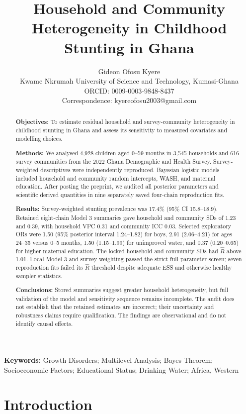 \documentclass[11pt]{article}
\title{Household and Community Heterogeneity in Childhood Stunting in Ghana}
\author{Gideon Ofosu Kyere\\\small Kwame Nkrumah University of Science and Technology, Kumasi-Ghana\\\small ORCID: 0009-0003-9848-8437\\\small Correspondence: kyereofosu2003@gmail.com}
\date{}
\begin{document}
\maketitle

\begin{abstract}
\noindent\textbf{Objectives:} To estimate residual household and survey-community heterogeneity in childhood stunting in Ghana and assess its sensitivity to measured covariates and modelling choices.

\noindent\textbf{Methods:} We analysed 4,928 children aged 0--59 months in 3,545 households and 616 survey communities from the 2022 Ghana Demographic and Health Survey. Survey-weighted descriptives were independently reproduced. Bayesian logistic models included household and community random intercepts, WASH, and maternal education. After posting the preprint, we audited all posterior parameters and scientific derived quantities in nine separately saved four-chain reproduction fits.

\noindent\textbf{Results:} Survey-weighted stunting prevalence was 17.4\% (95\% CI 15.8--18.9). Retained eight-chain Model 3 summaries gave household and community SDs of 1.23 and 0.39, with household VPC 0.31 and community ICC 0.03. Selected exploratory ORs were 1.50 (95\% posterior interval 1.24--1.82) for boys, 2.91 (2.06--4.21) for ages 24--35 versus 0--5 months, 1.50 (1.15--1.99) for unimproved water, and 0.37 (0.20--0.65) for higher maternal education. The locked household and community SDs had $\hat R$ above 1.01. Local Model 3 and survey weighting passed the strict full-parameter screen; seven reproduction fits failed its $\hat R$ threshold despite adequate ESS and otherwise healthy sampler statistics.

\noindent\textbf{Conclusions:} Stored summaries suggest greater household heterogeneity, but full validation of the model and sensitivity sequence remains incomplete. The audit does not establish that the retained estimates are incorrect; their uncertainty and robustness claims require qualification. The findings are observational and do not identify causal effects.
\end{abstract}

\noindent\textbf{Keywords:} Growth Disorders; Multilevel Analysis; Bayes Theorem; Socioeconomic Factors; Educational Status; Drinking Water; Africa, Western

\section{Introduction}
\end{document}
